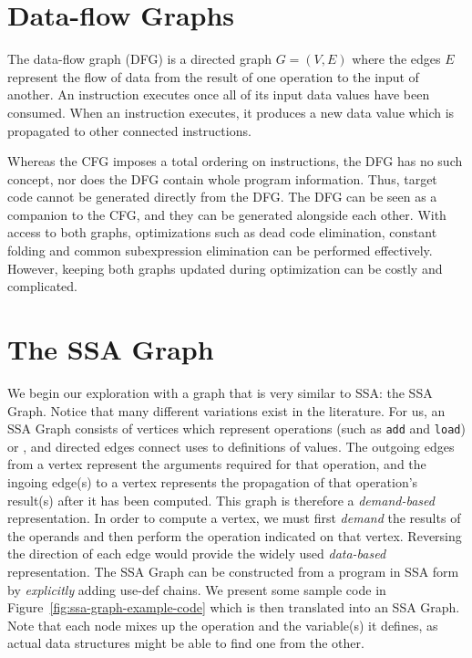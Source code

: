 \section{Data-flow Graphs}
The data-flow graph (DFG) is a directed graph $G=(V,E)$ where the edges $E$ represent the flow of data from the result of one operation to the input of another. 
An instruction executes once all of its input data values have been consumed. 
When an instruction executes, it produces a new data value which is propagated to other connected instructions.

Whereas the CFG imposes a total ordering on instructions, the DFG has no such concept, nor does the DFG contain whole program information. 
Thus, target code cannot be generated directly from the DFG. 
The DFG can be seen as a companion to the CFG, and they can be generated alongside each other. 
With access to both graphs, optimizations such as dead code elimination, constant folding and common subexpression elimination can be performed effectively. 
However, keeping both graphs updated during optimization can be costly and complicated.

\section{The SSA Graph}

We begin our exploration with a graph that is very similar to SSA: 
the SSA Graph. 
Notice that many different variations exist in the literature. 
For us, an SSA Graph consists of vertices which represent operations (such as \texttt{add} and \texttt{load}) or \phifuns, and directed edges connect uses to definitions of values. 
The outgoing edges from a vertex represent the arguments required for that operation, and the ingoing edge(s) to a vertex represents the propagation of that operation's result(s) after it has been computed. 
This graph is therefore a \textit{demand-based} representation. 
In order to compute a vertex, we must first \textit{demand} the results of the operands and then perform the operation indicated on that vertex. 
Reversing the direction of each edge would provide the widely used \emph{data-based} representation. 
The SSA Graph can be constructed from a program in SSA form by \textit{explicitly} adding use-def chains. 
We present some sample code in Figure~\ref{fig:ssa-graph-example-code} which is then translated into an SSA Graph.
Note that each node mixes up the operation and the variable(s) it defines, as actual data structures might be able to find one from the other.

